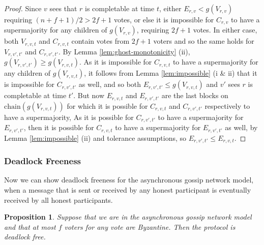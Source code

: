 \documentclass{article}
\newtheorem{proposition}[theorem]{Proposition}
\begin{document}
\begin{proof} 
Since $v$ sees that $r$ is completable at time $t$, 
either $E_{r,v} < g(V_{r,v})$ requiring $(n+f+1)/2 > 2f + 1$ votes, or else it is impossible for $C_{r,v}$ to have a supermajority for any children of $g(V_{r,v})$, requiring $2f + 1$ votes.
In either case, both $V_{r,v,t}$ and $C_{r,v,t}$ contain votes from $2f + 1$ voters and so the same holds for $V_{r,v',t'}$ and $C_{r,v',t'}$. 
By Lemma \ref{lem:ghost-monotonicity} (ii), $g(V_{r,v',t'}) \geq g(V_{r,v,t})$.
As it is impossible for $C_{r,v,t}$ to have a supermajority for any children of $g(V_{r,v,t})$, it follows from Lemma \ref{lem:impossible} (i \& ii) that it is impossible for $C_{r,v',t'}$ as well, and so both $E_{r,v',t'} \leq g(V_{r,v,t})$ and $v'$ sees $r$ is completable at time $t'$.
But now $E_{r,v,t}$ and $E_{r,v',t'}$ are the last blocks on $\textrm{chain}(g(V_{r,v,t}))$ for which it is possible for $C_{r,v,t}$ and $C_{r,v',t'}$ respectively to have a supermajority, 
As it is possible for $C_{r,v',t'}$ to have a supermajority for $E_{r,v',t'}$, then it is possible for $C_{r,v,t}$ to have a supermajority for $E_{r,v',t'}$ as well, by Lemma \ref{lem:impossible} (ii) and tolerance assumptions, so $E_{r,v',t'} \leq E_{r,v,t}$.
\end{proof}
 
\subsubsection{Deadlock Freeness}

Now we can show deadlock freeness for the asynchronous gossip network model, when a message that is sent or received by any honest participant is eventually received by all honest participants.

\begin{proposition} Suppose that we are in the asynchronous gossip network model and that at most $f$ voters for any vote are Byzantine. Then the protocol is deadlock free.\end{proposition}
\end{document}
